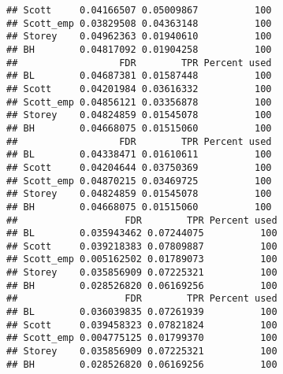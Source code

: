 \documentclass{article}\usepackage[]{graphicx}\usepackage[]{color}
\makeatletter
\newenvironment{kframe}{%
 \def\at@end@of@kframe{}%
 \ifinner\ifhmode%
  \def\at@end@of@kframe{\end{minipage}}%
  \begin{minipage}{\columnwidth}%
 \fi\fi%
 \def\FrameCommand##1{\hskip\@totalleftmargin \hskip-\fboxsep
 \colorbox{shadecolor}{##1}\hskip-\fboxsep
     \hskip-\linewidth \hskip-\@totalleftmargin \hskip\columnwidth}%
 \MakeFramed {\advance\hsize-\width
   \@totalleftmargin\z@ \linewidth\hsize
   \@setminipage}}%
 {\par\unskip\endMakeFramed%
 \at@end@of@kframe}
\newenvironment{knitrout}{}{} %
\makeatother
\begin{document}
\begin{knitrout}
\begin{kframe}
\begin{verbatim}
## Scott     0.04166507 0.05009867          100
## Scott_emp 0.03829508 0.04363148          100
## Storey    0.04962363 0.01940610          100
## BH        0.04817092 0.01904258          100
##                  FDR        TPR Percent used
## BL        0.04687381 0.01587448          100
## Scott     0.04201984 0.03616332          100
## Scott_emp 0.04856121 0.03356878          100
## Storey    0.04824859 0.01545078          100
## BH        0.04668075 0.01515060          100
##                  FDR        TPR Percent used
## BL        0.04338471 0.01610611          100
## Scott     0.04204644 0.03750369          100
## Scott_emp 0.04870215 0.03469725          100
## Storey    0.04824859 0.01545078          100
## BH        0.04668075 0.01515060          100
##                   FDR        TPR Percent used
## BL        0.035943462 0.07244075          100
## Scott     0.039218383 0.07809887          100
## Scott_emp 0.005162502 0.01789073          100
## Storey    0.035856909 0.07225321          100
## BH        0.028526820 0.06169256          100
##                   FDR        TPR Percent used
## BL        0.036039835 0.07261939          100
## Scott     0.039458323 0.07821824          100
## Scott_emp 0.004775125 0.01799370          100
## Storey    0.035856909 0.07225321          100
## BH        0.028526820 0.06169256          100
\end{verbatim}
\end{kframe}
\end{knitrout}
\end{document}
